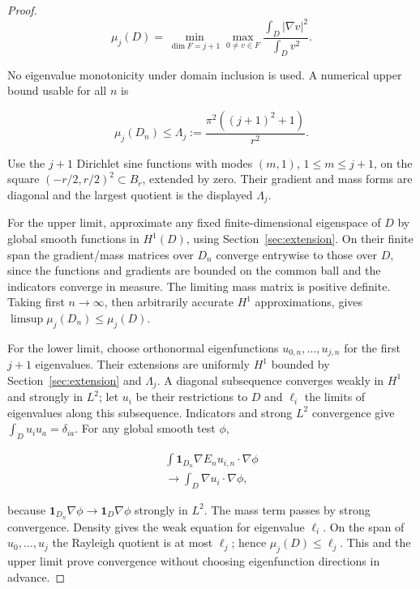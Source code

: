 \documentclass[11pt]{article}
\theoremstyle{definition}
\theoremstyle{remark}
\numberwithin{equation}{section}
\begin{document}
\begin{proof}
\begin{equation}\label{eq:src-4-02}
\mu_j(D)=\min_{\dim F=j+1}\max_{0\ne v\in F}\frac{\int_D|\nabla v|^2}{\int_Dv^2}.
\end{equation}

No eigenvalue monotonicity under domain inclusion is used. A numerical upper bound usable for all $n$ is

\begin{equation}\label{eq:src-4-03}
\mu_j(D_n)\le\Lambda_j:=\frac{\pi^2((j+1)^2+1)}{r^2}.
\end{equation}

Use the $j+1$ Dirichlet sine functions with modes $(m,1)$, $1\le m\le j+1$, on the square $(-r/2,r/2)^2\subset B_r$, extended by zero. Their gradient and mass forms are diagonal and the largest quotient is the displayed $\Lambda_j$.

For the upper limit, approximate any fixed finite-dimensional eigenspace of $D$ by global smooth functions in $H^1(D)$, using Section~\ref{sec:extension}. On their finite span the gradient/mass matrices over $D_n$ converge entrywise to those over $D$, since the functions and gradients are bounded on the common ball and the indicators converge in measure. The limiting mass matrix is positive definite. Taking first $n\to\infty$, then arbitrarily accurate $H^1$ approximations, gives $\limsup\mu_j(D_n)\le\mu_j(D)$.

For the lower limit, choose orthonormal eigenfunctions $u_{0,n},\ldots,u_{j,n}$ for the first $j+1$ eigenvalues. Their extensions are uniformly $H^1$ bounded by Section~\ref{sec:extension} and $\Lambda_j$. A diagonal subsequence converges weakly in $H^1$ and strongly in $L^2$; let $u_i$ be their restrictions to $D$ and $\ell_i$ the limits of eigenvalues along this subsequence. Indicators and strong $L^2$ convergence give $\int_Du_iu_a=\delta_{ia}$. For any global smooth test $\phi$,

\begin{equation}\label{eq:src-4-04}
\begin{gathered}
\int \mathbf1_{D_n}\nabla E_nu_{i,n}\cdot\nabla\phi \\
\to\int_D\nabla u_i\cdot\nabla\phi,
\end{gathered}
\end{equation}

because $\mathbf1_{D_n}\nabla\phi\to\mathbf1_D\nabla\phi$ strongly in $L^2$. The mass term passes by strong convergence. Density gives the weak equation for eigenvalue $\ell_i$. On the span of $u_0,\ldots,u_j$ the Rayleigh quotient is at most $\ell_j$; hence $\mu_j(D)\le\ell_j$. This and the upper limit prove convergence without choosing eigenfunction directions in advance.


\end{proof}
\end{document}
